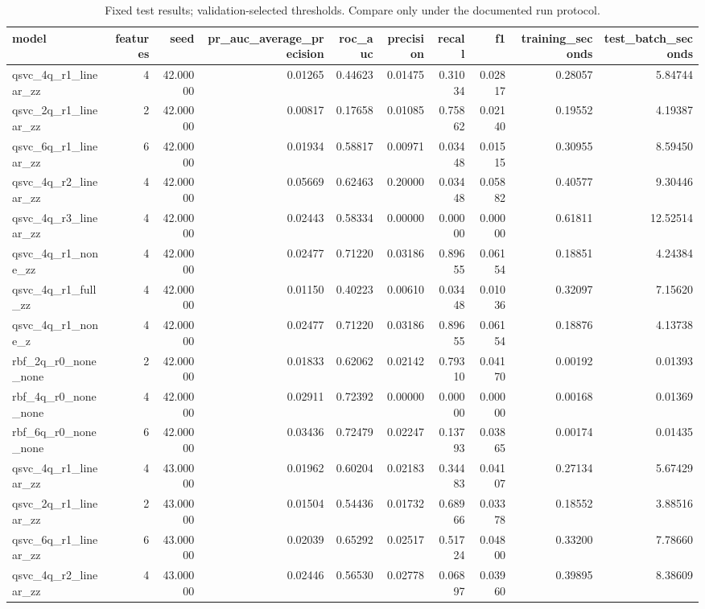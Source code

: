 \begin{table}
\caption{Fixed test results; validation-selected thresholds. Compare only under the documented run protocol.}
\begin{tabular}{lrrrrrrrrr}
\toprule
model & features & seed & pr\_auc\_average\_precision & roc\_auc & precision & recall & f1 & training\_seconds & test\_batch\_seconds \\
\midrule
qsvc\_4q\_r1\_linear\_zz & 4 & 42.00000 & 0.01265 & 0.44623 & 0.01475 & 0.31034 & 0.02817 & 0.28057 & 5.84744 \\
qsvc\_2q\_r1\_linear\_zz & 2 & 42.00000 & 0.00817 & 0.17658 & 0.01085 & 0.75862 & 0.02140 & 0.19552 & 4.19387 \\
qsvc\_6q\_r1\_linear\_zz & 6 & 42.00000 & 0.01934 & 0.58817 & 0.00971 & 0.03448 & 0.01515 & 0.30955 & 8.59450 \\
qsvc\_4q\_r2\_linear\_zz & 4 & 42.00000 & 0.05669 & 0.62463 & 0.20000 & 0.03448 & 0.05882 & 0.40577 & 9.30446 \\
qsvc\_4q\_r3\_linear\_zz & 4 & 42.00000 & 0.02443 & 0.58334 & 0.00000 & 0.00000 & 0.00000 & 0.61811 & 12.52514 \\
qsvc\_4q\_r1\_none\_zz & 4 & 42.00000 & 0.02477 & 0.71220 & 0.03186 & 0.89655 & 0.06154 & 0.18851 & 4.24384 \\
qsvc\_4q\_r1\_full\_zz & 4 & 42.00000 & 0.01150 & 0.40223 & 0.00610 & 0.03448 & 0.01036 & 0.32097 & 7.15620 \\
qsvc\_4q\_r1\_none\_z & 4 & 42.00000 & 0.02477 & 0.71220 & 0.03186 & 0.89655 & 0.06154 & 0.18876 & 4.13738 \\
rbf\_2q\_r0\_none\_none & 2 & 42.00000 & 0.01833 & 0.62062 & 0.02142 & 0.79310 & 0.04170 & 0.00192 & 0.01393 \\
rbf\_4q\_r0\_none\_none & 4 & 42.00000 & 0.02911 & 0.72392 & 0.00000 & 0.00000 & 0.00000 & 0.00168 & 0.01369 \\
rbf\_6q\_r0\_none\_none & 6 & 42.00000 & 0.03436 & 0.72479 & 0.02247 & 0.13793 & 0.03865 & 0.00174 & 0.01435 \\
qsvc\_4q\_r1\_linear\_zz & 4 & 43.00000 & 0.01962 & 0.60204 & 0.02183 & 0.34483 & 0.04107 & 0.27134 & 5.67429 \\
qsvc\_2q\_r1\_linear\_zz & 2 & 43.00000 & 0.01504 & 0.54436 & 0.01732 & 0.68966 & 0.03378 & 0.18552 & 3.88516 \\
qsvc\_6q\_r1\_linear\_zz & 6 & 43.00000 & 0.02039 & 0.65292 & 0.02517 & 0.51724 & 0.04800 & 0.33200 & 7.78660 \\
qsvc\_4q\_r2\_linear\_zz & 4 & 43.00000 & 0.02446 & 0.56530 & 0.02778 & 0.06897 & 0.03960 & 0.39895 & 8.38609 \\

\end{tabular}
\end{table}
